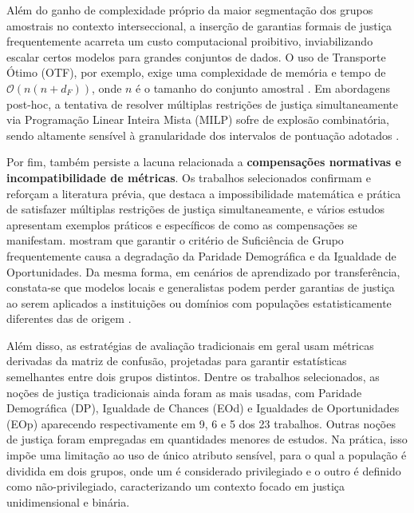 Além do ganho de complexidade próprio da maior segmentação dos grupos amostrais no contexto interseccional, a inserção de garantias formais de justiça frequentemente acarreta um custo computacional proibitivo, inviabilizando escalar certos modelos para grandes conjuntos de dados. O uso de Transporte Ótimo (OTF), por exemplo, exige uma complexidade de memória e tempo de $\mathcal{O}(n(n + d_F))$, onde $n$ é o tamanho do conjunto amostral \cite{buyl2022optimal}. Em abordagens post-hoc, a tentativa de resolver múltiplas restrições de justiça simultaneamente via Programação Linear Inteira Mista (MILP) sofre de explosão combinatória, sendo altamente sensível à granularidade dos intervalos de pontuação adotados \cite{hsu2022pushing}.

Por fim, também persiste a lacuna relacionada a \textbf{compensações normativas e incompatibilidade de métricas}. Os trabalhos selecionados confirmam e reforçam a literatura prévia, que destaca a impossibilidade matemática e prática de satisfazer múltiplas restrições de justiça simultaneamente, e vários estudos apresentam exemplos práticos e específicos de como as compensações se manifestam. \citet{shui2022learning} mostram que garantir o critério de Suficiência de Grupo frequentemente causa a degradação da Paridade Demográfica e da Igualdade de Oportunidades. Da mesma forma, em cenários de aprendizado por transferência, constata-se que modelos locais e generalistas podem perder garantias de justiça ao serem aplicados a instituições ou domínios com populações estatisticamente diferentes das de origem \cite{gardner2023cross}.

Além disso, as estratégias de avaliação tradicionais em geral usam métricas derivadas da matriz de confusão, projetadas para garantir estatísticas semelhantes entre dois grupos distintos. Dentre os trabalhos selecionados, as noções de justiça tradicionais ainda foram as mais usadas, com Paridade Demográfica (DP), Igualdade de Chances (EOd) e Igualdades de Oportunidades (EOp) aparecendo respectivamente em 9, 6 e 5 dos 23 trabalhos. Outras noções de justiça foram empregadas em quantidades menores de estudos. Na prática, isso impõe uma limitação ao uso de único atributo sensível, para o qual a população é dividida em dois grupos, onde um é considerado privilegiado e o outro é definido como não-privilegiado, caracterizando um contexto focado em justiça unidimensional e binária.

